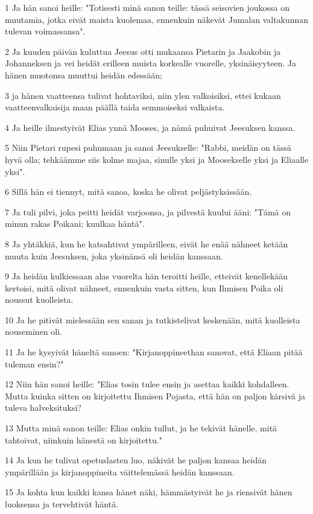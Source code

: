 \par 1 Ja hän sanoi heille: "Totisesti minä sanon teille: tässä seisovien joukossa on muutamia, jotka eivät maista kuolemaa, ennenkuin näkevät Jumalan valtakunnan tulevan voimassansa".
\par 2 Ja kuuden päivän kuluttua Jeesus otti mukaansa Pietarin ja Jaakobin ja Johanneksen ja vei heidät erilleen muista korkealle vuorelle, yksinäisyyteen. Ja hänen muotonsa muuttui heidän edessään;
\par 3 ja hänen vaatteensa tulivat hohtaviksi, niin ylen valkoisiksi, ettei kukaan vaatteenvalkaisija maan päällä taida semmoiseksi valkaista.
\par 4 Ja heille ilmestyivät Elias ynnä Mooses, ja nämä puhuivat Jeesuksen kanssa.
\par 5 Niin Pietari rupesi puhumaan ja sanoi Jeesukselle: "Rabbi, meidän on tässä hyvä olla; tehkäämme siis kolme majaa, sinulle yksi ja Moosekselle yksi ja Eliaalle yksi".
\par 6 Sillä hän ei tiennyt, mitä sanoa, koska he olivat peljästyksissään.
\par 7 Ja tuli pilvi, joka peitti heidät varjoonsa, ja pilvestä kuului ääni: "Tämä on minun rakas Poikani; kuulkaa häntä".
\par 8 Ja yhtäkkiä, kun he katsahtivat ympärilleen, eivät he enää nähneet ketään muuta kuin Jeesuksen, joka yksinänsä oli heidän kanssaan.
\par 9 Ja heidän kulkiessaan alas vuorelta hän teroitti heille, etteivät kenellekään kertoisi, mitä olivat nähneet, ennenkuin vasta sitten, kun Ihmisen Poika oli noussut kuolleista.
\par 10 Ja he pitivät mielessään sen sanan ja tutkistelivat keskenään, mitä kuolleista nouseminen oli.
\par 11 Ja he kysyivät häneltä sanoen: "Kirjanoppineethan sanovat, että Eliaan pitää tuleman ensin?"
\par 12 Niin hän sanoi heille: "Elias tosin tulee ensin ja asettaa kaikki kohdalleen. Mutta kuinka sitten on kirjoitettu Ihmisen Pojasta, että hän on paljon kärsivä ja tuleva halveksituksi?
\par 13 Mutta minä sanon teille: Elias onkin tullut, ja he tekivät hänelle, mitä tahtoivat, niinkuin hänestä on kirjoitettu."
\par 14 Ja kun he tulivat opetuslasten luo, näkivät he paljon kansaa heidän ympärillään ja kirjanoppineita väittelemässä heidän kanssaan.
\par 15 Ja kohta kun kaikki kansa hänet näki, hämmästyivät he ja riensivät hänen luoksensa ja tervehtivät häntä.
